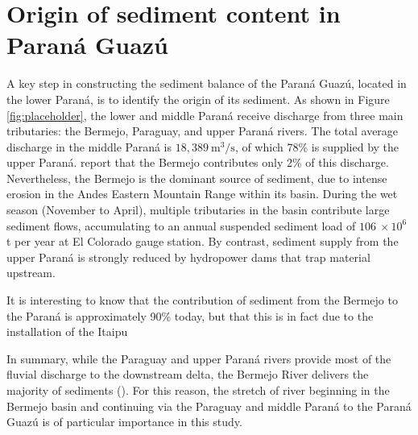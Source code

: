 \section{Origin of sediment content in Paraná Guazú}

A key step in constructing the sediment balance of the Paraná Guazú, located in the lower Paraná, is to identify the origin of its sediment. As shown in Figure \ref{fig:placeholder}, the lower and middle Paraná receive discharge from three main tributaries: the Bermejo, Paraguay, and upper Paraná rivers. The total average discharge in the middle Paraná is $18,389~\mathrm{m^3/s}$, of which 78\% is supplied by the upper Paraná. \citeauthor{lopezweibelSourcesTemporalDynamics2022} report that the Bermejo contributes only 2\% of this discharge. Nevertheless, the Bermejo is the dominant source of sediment, due to intense erosion in the Andes Eastern Mountain Range within its basin. During the wet season (November to April), multiple tributaries in the basin contribute large sediment flows, accumulating to an annual suspended sediment load of $106 ~\times 10^6$ t per year at El Colorado gauge station. By contrast, sediment supply from the upper Paraná is strongly reduced by hydropower dams that trap material upstream. 

It is interesting to know that the contribution of sediment from the Bermejo to the Paraná is approximately 90\% today, but that this is in fact due to the installation of the Itaipu 

In summary, while the Paraguay and upper Paraná rivers provide most of the fluvial discharge to the downstream delta, the Bermejo River delivers the majority of sediments (\cite{lopezweibelSourcesTemporalDynamics2022}). For this reason, the stretch of river beginning in the Bermejo basin and continuing via the Paraguay and middle Paraná to the Paraná Guazú is of particular importance in this study.  












